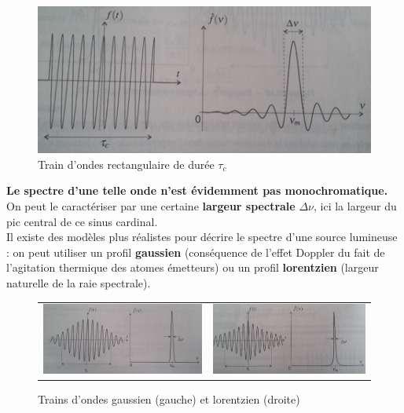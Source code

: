 \documentclass[11pt,a4paper]{report}
\begin{document}
\begin{figure}[h!]
	\begin{center}
		\includegraphics[scale = 0.5]{trainrectangulaire.png}
	\end{center}
	\caption{Train d'ondes rectangulaire de durée $\tau_c$}
\end{figure}

\textbf{Le spectre d'une telle onde n'est évidemment pas monochromatique.} On peut le caractériser par une certaine \textbf{largeur spectrale} $\Delta \nu$, ici la largeur du pic central de ce sinus cardinal.\\

Il existe des modèles plus réalistes pour décrire le spectre d'une source lumineuse : on peut utiliser un profil \textbf{gaussien} (conséquence de l'effet Doppler du fait de l'agitation thermique des atomes émetteurs) ou un profil \textbf{lorentzien} (largeur naturelle de la raie spectrale).\\

\begin{figure}[h!]
	\begin{tabular}{cc}
  		\includegraphics[scale = 0.5]{traingaussien.png} &
   		\includegraphics[scale = 0.5]{trainlorentzien.png}\\
	\end{tabular}
	\caption{Trains d'ondes gaussien (gauche) et lorentzien (droite)}
\end{figure}
\end{document}
